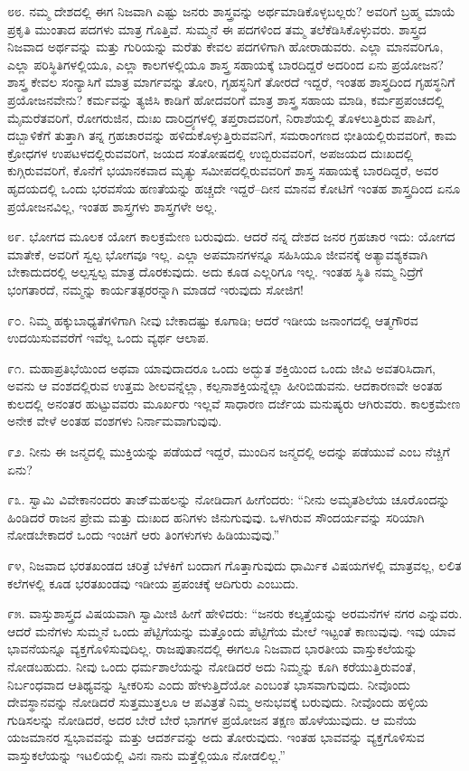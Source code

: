 ೮೮. ನಮ್ಮ ದೇಶದಲ್ಲಿ ಈಗ ನಿಜವಾಗಿ ಎಷ್ಟು ಜನರು ಶಾಸ್ತ್ರವನ್ನು ಅರ್ಥಮಾಡಿಕೊಳ್ಳಬಲ್ಲರು? ಅವರಿಗೆ ಬ್ರಹ್ಮ ಮಾಯೆ ಪ್ರಕೃತಿ ಮುಂತಾದ ಪದಗಳು ಮಾತ್ರ ಗೊತ್ತಿವೆ. ಸುಮ್ಮನೆ ಈ ಪದಗಳಿಂದ ತಮ್ಮ ತಲೆಕೆಡಿಸಿಕೊಳ್ಳುವರು. ಶಾಸ್ತ್ರದ ನಿಜವಾದ ಅರ್ಥವನ್ನು ಮತ್ತು ಗುರಿಯನ್ನು ಮರೆತು ಕೇವಲ ಪದಗಳಿಗಾಗಿ ಹೋರಾಡುವರು. ಎಲ್ಲಾ ಮಾನವರಿಗೂ, ಎಲ್ಲಾ ಪರಿಸ್ಥಿತಿಗಳಲ್ಲಿಯೂ, ಎಲ್ಲಾ ಕಾಲಗಳಲ್ಲಿಯೂ ಶಾಸ್ತ್ರ ಸಹಾಯಕ್ಕೆ ಬಾರದಿದ್ದರೆ ಅದರಿಂದ ಏನು ಪ್ರಯೋಜನ? ಶಾಸ್ತ್ರ ಕೇವಲ ಸಂನ್ಯಾಸಿಗೆ ಮಾತ್ರ ಮಾರ್ಗವನ್ನು ತೋರಿ, ಗೃಹಸ್ಥನಿಗೆ ತೋರದೆ ಇದ್ದರೆ, ಇಂತಹ ಶಾಸ್ತ್ರದಿಂದ ಗೃಹಸ್ಥನಿಗೆ ಪ್ರಯೋಜನವೇನು? ಕರ್ಮವನ್ನು ತ್ಯಜಿಸಿ ಕಾಡಿಗೆ ಹೋದವರಿಗೆ ಮಾತ್ರ ಶಾಸ್ತ್ರ ಸಹಾಯ ಮಾಡಿ, ಕರ್ಮಪ್ರಪಂಚದಲ್ಲಿ ಮೈಮರೆತವರಿಗೆ, ರೋಗರುಜಿನ, ದುಃಖ ದಾರಿದ್ರ್ಯಗಳಲ್ಲಿ ತಪ್ತರಾದವರಿಗೆ, ನಿರಾಶೆಯಲ್ಲಿ ತೊಳಲುತ್ತಿರುವ ಪಾಪಿಗೆ, ದಬ್ಬಾಳಿಕೆಗೆ ತುತ್ತಾಗಿ ತನ್ನ ಗ್ರಹಚಾರವನ್ನು ಹಳಿದುಕೊಳ್ಳುತ್ತಿರುವವನಿಗೆ, ಸಮರಾಂಗಣದ ಭೀತಿಯಲ್ಲಿರುವವರಿಗೆ, ಕಾಮ ಕ್ರೋಧಗಳ ಉಪಟಳದಲ್ಲಿರುವವರಿಗೆ, ಜಯದ ಸಂತೋಷದಲ್ಲಿ ಉಬ್ಬಿರುವವರಿಗೆ, ಅಪಜಯದ ದುಃಖದಲ್ಲಿ ಕುಗ್ಗಿರುವವರಿಗೆ, ಕೊನೆಗೆ ಭಯಾನಕವಾದ ಮೃತ್ಯು ಸಮೀಪದಲ್ಲಿರುವವರಿಗೆ ಶಾಸ್ತ್ರ ಸಹಾಯಕ್ಕೆ ಬಾರದಿದ್ದರೆ, ಅವರ ಹೃದಯದಲ್ಲಿ ಒಂದು ಭರವಸೆಯ ಹಣತೆಯನ್ನು ಹಚ್ಚದೇ ಇದ್ದರೆ–ದೀನ ಮಾನವ ಕೋಟಿಗೆ ಇಂತಹ ಶಾಸ್ತ್ರದಿಂದ ಏನೂ ಪ್ರಯೋಜನವಿಲ್ಲ, ಇಂತಹ ಶಾಸ್ತ್ರಗಳು ಶಾಸ್ತ್ರಗಳೇ ಅಲ್ಲ.

೮೯. ಭೋಗದ ಮೂಲಕ ಯೋಗ ಕಾಲಕ್ರಮೇಣ ಬರುವುದು. ಆದರೆ ನನ್ನ ದೇಶದ ಜನರ ಗ್ರಹಚಾರ ಇದು: ಯೋಗದ ಮಾತೇಕೆ, ಅವರಿಗೆ ಸ್ವಲ್ಪ ಭೋಗವೂ ಇಲ್ಲ. ಎಲ್ಲಾ ಅಪಮಾನಗಳನ್ನೂ ಸಹಿಸಿಯೂ ಜೀವನಕ್ಕೆ ಅತ್ಯಾವಶ್ಯಕವಾಗಿ ಬೇಕಾದುದರಲ್ಲಿ ಅಲ್ಪಸ್ವಲ್ಪ ಮಾತ್ರ ದೊರಕುವುದು. ಅದು ಕೂಡ ಎಲ್ಲರಿಗೂ ಇಲ್ಲ. ಇಂತಹ ಸ್ಥಿತಿ ನಮ್ಮ ನಿದ್ರೆಗೆ ಭಂಗತಾರದೆ, ನಮ್ಮನ್ನು ಕಾರ್ಯತತ್ಪರರನ್ನಾಗಿ ಮಾಡದೆ ಇರುವುದು ಸೋಜಿಗ!

೯೦. ನಿಮ್ಮ ಹಕ್ಕುಬಾಧ್ಯತೆಗಳಿಗಾಗಿ ನೀವು ಬೇಕಾದಷ್ಟು ಕೂಗಾಡಿ; ಆದರೆ ಇಡೀಯ ಜನಾಂಗದಲ್ಲಿ ಆತ್ಮಗೌರವ ಉದಯಿಸುವವರೆಗೆ ಇವೆಲ್ಲ ಒಂದು ವ್ಯರ್ಥ ಆಲಾಪ.

೯೧. ಮಹಾಪ್ರತಿಭೆಯಿಂದ ಅಥವಾ ಯಾವುದಾದರೂ ಒಂದು ಅದ್ಭುತ ಶಕ್ತಿಯಿಂದ ಒಂದು ಜೀವಿ ಅವತರಿಸಿದಾಗ, ಅವನು ಆ ವಂಶದಲ್ಲಿರುವ ಉತ್ತಮ ಶೀಲವನ್ನೆಲ್ಲಾ, ಕಲ್ಪನಾಶಕ್ತಿಯನ್ನೆಲ್ಲಾ ಹೀರಿಬಿಡುವನು. ಆದಕಾರಣವೇ ಅಂತಹ ಕುಲದಲ್ಲಿ ಅನಂತರ ಹುಟ್ಟುವವರು ಮೂರ್ಖರು ಇಲ್ಲವೆ ಸಾಧಾರಣ ದರ್ಜೆಯ ಮನುಷ್ಯರು ಆಗಿರುವರು. ಕಾಲಕ್ರಮೇಣ ಅನೇಕ ವೇಳೆ ಅಂತಹ ವಂಶಗಳು ನಿರ್ನಾಮವಾಗುವುವು.

೯೨. ನೀನು ಈ ಜನ್ಮದಲ್ಲಿ ಮುಕ್ತಿಯನ್ನು ಪಡೆಯದೆ ಇದ್ದರೆ, ಮುಂದಿನ ಜನ್ಮದಲ್ಲಿ ಅದನ್ನು ಪಡೆಯುವೆ ಎಂಬ ನೆಚ್ಚಿಗೆ ಏನು?

೯೩. ಸ್ವಾಮಿ ವಿವೇಕಾನಂದರು ತಾಜ್‌ಮಹಲನ್ನು ನೋಡಿದಾಗ ಹೀಗೆಂದರು: “ನೀನು ಅಮೃತಶಿಲೆಯ ಚೂರೊಂದನ್ನು ಹಿಂಡಿದರೆ ರಾಜನ ಪ್ರೇಮ ಮತ್ತು ದುಃಖದ ಹನಿಗಳು ಜಿನುಗುವುವು. ಒಳಗಿರುವ ಸೌಂದರ್ಯವನ್ನು ಸರಿಯಾಗಿ ನೋಡಬೇಕಾದರೆ ಒಂದು ಇಂಚಿಗೆ ಆರು ತಿಂಗಳುಗಳು ಹಿಡಿಯುವುವು.”

೯೪, ನಿಜವಾದ ಭರತಖಂಡದ ಚರಿತ್ರೆ ಬೆಳಕಿಗೆ ಬಂದಾಗ ಗೊತ್ತಾಗುವುದು ಧಾರ್ಮಿಕ ವಿಷಯಗಳಲ್ಲಿ ಮಾತ್ರವಲ್ಲ, ಲಲಿತ ಕಲೆಗಳಲ್ಲಿ ಕೂಡ ಭರತಖಂಡವು ಇಡೀಯ ಪ್ರಪಂಚಕ್ಕೆ ಆದಿಗುರು ಎಂಬುದು.

೯೫. ವಾಸ್ತುಶಾಸ್ತ್ರದ  ವಿಷಯವಾಗಿ ಸ್ವಾಮೀಜಿ ಹೀಗೆ ಹೇಳಿದರು: “ಜನರು ಕಲ್ಕತ್ತೆಯನ್ನು ಅರಮನೆಗಳ ನಗರ ಎನ್ನುವರು. ಆದರೆ ಮನೆಗಳು ಸುಮ್ಮನೆ ಒಂದು ಪೆಟ್ಟಿಗೆಯನ್ನು ಮತ್ತೊಂದು ಪೆಟ್ಟಿಗೆಯ ಮೇಲೆ ಇಟ್ಟಂತೆ ಕಾಣುವುವು. ಇವು ಯಾವ ಭಾವನೆಯನ್ನೂ ವ್ಯಕ್ತಗೊಳಿಸುವುದಿಲ್ಲ. ರಾಜಪುತಾನದಲ್ಲಿ ಈಗಲೂ ನಿಜವಾದ ಭಾರತೀಯ ವಾಸ್ತುಕಲೆಯನ್ನು ನೋಡಬಹುದು. ನೀವು ಒಂದು ಧರ್ಮಶಾಲೆಯನ್ನು ನೋಡಿದರೆ ಅದು ನಿಮ್ಮನ್ನು ಕೂಗಿ ಕರೆಯುತ್ತಿರುವಂತೆ, ನಿರ್ಬಂಧವಾದ ಆತಿಥ್ಯವನ್ನು ಸ್ವೀಕರಿಸು ಎಂದು ಹೇಳುತ್ತಿದೆಯೋ ಎಂಬಂತೆ ಭಾಸವಾಗುವುದು. ನೀವೊಂದು ದೇವಸ್ಥಾನವನ್ನು ನೋಡಿದರೆ ಸುತ್ತಮುತ್ತಲೂ ಆ ಪವಿತ್ರತೆ ನಿಮ್ಮ ಅನುಭವಕ್ಕೆ ಬರುವುದು. ನೀವೊಂದು ಹಳ್ಳಿಯ ಗುಡಿಸಲನ್ನು ನೋಡಿದರೆ, ಅದರ ಬೇರೆ ಬೇರೆ ಭಾಗಗಳ ಪ್ರಯೋಜನ ತಕ್ಷಣ ಹೊಳೆಯುವುದು. ಆ ಮನೆಯ ಯಜಮಾನರ ಸ್ವಭಾವವನ್ನು ಮತ್ತು ಆದರ್ಶವನ್ನು ಅದು ತೋರುವುದು. ಇಂತಹ ಭಾವವನ್ನು ವ್ಯಕ್ತಗೊಳಿಸುವ ವಾಸ್ತುಕಲೆಯನ್ನು ಇಟಲಿಯಲ್ಲಿ ವಿನಃ ನಾನು ಮತ್ತೆಲ್ಲಿಯೂ ನೋಡಲಿಲ್ಲ.”

